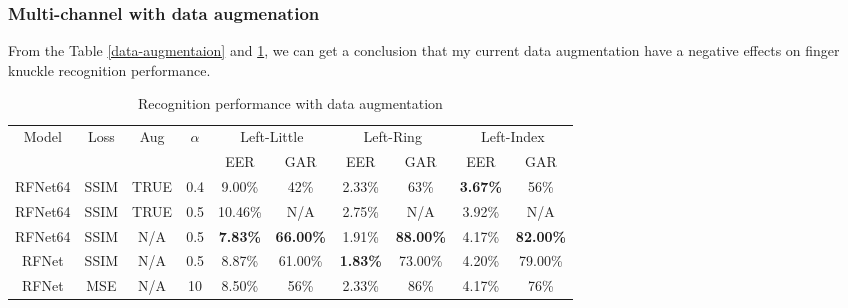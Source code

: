 \subsubsection{Multi-channel with data augmenation}

From the Table \ref{data-augmentaion} and \ref{rfn64-ssim-data}, we can get a conclusion that my current data augmentation have a negative effects on finger knuckle recognition performance.

\begin{table}[ht]
    \centering
    \caption{Recognition performance with data augmentation}
    \begin{tabular}{cccccccccc}
    \hline
    \multirow{2}{*}{Model} & \multirow{2}{*}{Loss} & \multirow{2}{*}{Aug} & \multirow{2}{*}{$\alpha$} & \multicolumn{2}{c}{Left-Little}    & \multicolumn{2}{c}{Left-Ring}      & \multicolumn{2}{c}{Left-Index}     \\
                           &                       &                      &                        & EER             & GAR              & EER             & GAR              & EER             & GAR              \\ \hline
    RFNet64                & SSIM                  & TRUE                 & 0.4                    & 9.00\%          & 42\%             & 2.33\%          & 63\%             & \textbf{3.67\%} & 56\%             \\
    RFNet64                & SSIM                  & TRUE                 & 0.5                    & 10.46\%         & N/A              & 2.75\%          & N/A              & 3.92\%          & N/A              \\
    RFNet64                & SSIM                  & N/A                  & 0.5                    & \textbf{7.83\%} & \textbf{66.00\%} & 1.91\%          & \textbf{88.00\%} & 4.17\%          & \textbf{82.00\%} \\
    RFNet                  & SSIM                  & N/A                  & 0.5                    & 8.87\%          & 61.00\%          & \textbf{1.83\%} & 73.00\%          & 4.20\%          & 79.00\%          \\
    RFNet                  & MSE                   & N/A                  & 10                     & 8.50\%          & 56\%             & 2.33\%          & 86\%             & 4.17\%          & 76\%             \\ \hline
    \end{tabular}
    \label{rfn64-ssim-data}
\end{table}


